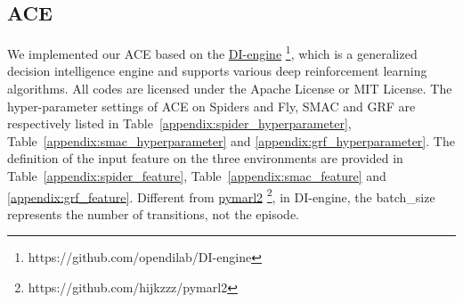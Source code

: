 \documentclass[letterpaper]{article} \usepackage{aaai23}  \usepackage{times}  \usepackage{helvet}  \usepackage{courier}  \usepackage[hyphens]{url}  \usepackage{graphicx} \urlstyle{rm} \def\UrlFont{\rm}  \usepackage{natbib}  \usepackage{caption} \frenchspacing  \setlength{\pdfpagewidth}{8.5in} \setlength{\pdfpageheight}{11in} \usepackage{algorithm}
\begin{document}
\subsection{ACE}
We implemented our ACE based on the \href{https://github.com/opendilab/DI-engine}{DI-engine} \footnote{https://github.com/opendilab/DI-engine}, which is a generalized decision intelligence engine and supports various deep reinforcement learning algorithms. All codes are licensed under the Apache License or MIT License.
The hyper-parameter settings of ACE on Spiders and Fly, SMAC and GRF are respectively listed in Table~\ref{appendix:spider_hyperparameter}, Table~\ref{appendix:smac_hyperparameter} and \ref{appendix:grf_hyperparameter}. The definition of the input feature on the three environments are provided in Table~\ref{appendix:spider_feature}, Table~\ref{appendix:smac_feature} and \ref{appendix:grf_feature}.
Different from \href{https://github.com/hijkzzz/pymarl2}{pymarl2} \footnote{https://github.com/hijkzzz/pymarl2}, in DI-engine, 
the batch\_size represents the number of transitions, not the episode.
\end{document}

